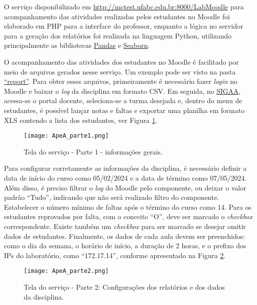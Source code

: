 O serviço disponibilizado em \url{http://mctest.ufabc.edu.br:8000/LabMoodle} para acompanhamento das atividades realizadas pelos estudantes no Moodle foi elaborado em PHP para a interface do professor, enquanto a lógica no servidor para a geração dos relatórios foi realizada na linguagem Python, utilizando principalmente as bibliotecas \href{https://pandas.pydata.org}{Pandas} e \href{https://seaborn.pydata.org}{Seaborn}.

O acompanhamento das atividades dos estudantes no Moodle é facilitado por meio de arquivos gerados nesse serviço. Um exemplo pode ser visto na pasta \href{http://mctest.ufabc.edu.br:8000/LabMoodle/modelos/report}{``report''}. Para obter esses arquivos, primeiramente é necessário fazer \textit{login} no Moodle e baixar o \textit{log} da disciplina em formato CSV. Em seguida, no \href{https://sig.ufabc.edu.br/sigaa/verTelaLogin.do}{SIGAA}, acessa-se o portal docente, seleciona-se a turma desejada e, dentro do menu de estudantes, é possível lançar notas e faltas e exportar uma planilha em formato XLS contendo a lista dos estudantes, ver Figura \ref{fig:ApeA_parte1}.

\begin{figure}[!ht]
    \centering
    \texttt{[image: ApeA\_parte1.png]}
     \caption{Tela do serviço - Parte 1 - informações gerais.}
  \label{fig:ApeA_parte1}
  \end{figure}


Para configurar corretamente as informações da disciplina, é necessário definir a data de início do curso como 05/02/2024 e a data de término como 07/05/2024. Além disso, é preciso filtrar o \textit{log} do Moodle pelo componente, ou deixar o valor padrão ``Tudo'', indicando que não será realizado filtro do componente. Estabelecer o número mínimo de faltas após o término do curso como 14. Para os estudantes reprovados por falta, com o conceito ``O'', deve ser marcado o \textit{checkbox} correspondente. Existe também um \textit{checkbox} para ser marcado se desejar omitir dados de estudantes. Finalmente, os dados de cada aula devem ser preenchidos: como o dia da semana, o horário de início, a duração de 2 horas, e o prefixo dos IPs do laboratório, como ``172.17.14'', conforme apresentado na Figura \ref{fig:ApeA_parte2}.


  \begin{figure}[!ht]
    \centering
    \texttt{[image: ApeA\_parte2.png]}
     \caption{Tela do serviço - Parte 2: Configurações dos relatórios e dos dados da disciplina.}
  \label{fig:ApeA_parte2}
  \end{figure}

